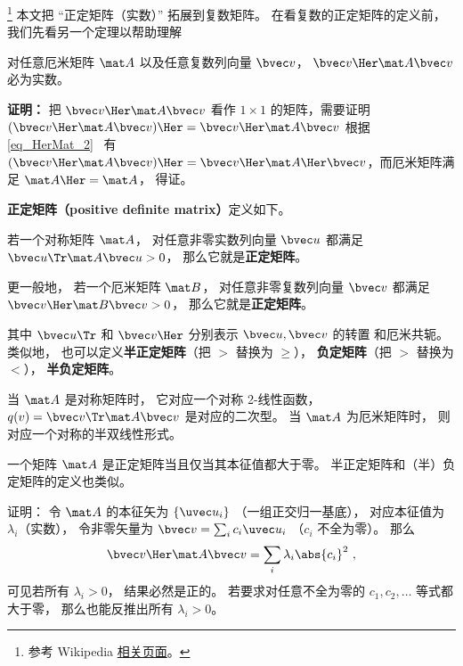 


\footnote{参考 Wikipedia \href{https://en.wikipedia.org/wiki/Definite_matrix}{相关页面}。}
本文把 “正定矩阵（实数）” 拓展到复数矩阵。 在看复数的正定矩阵的定义前，我们先看另一个定理以帮助理解

\begin{theorem}{}
对任意厄米矩阵 $\mat A$ 以及任意复数列向量 $\bvec v$， $\bvec v\Her \mat A \bvec v$ 必为实数。
\end{theorem}
\textbf{证明：} 把 $\bvec v\Her \mat A \bvec v$ 看作 $1\times 1$ 的矩阵，需要证明 $(\bvec v\Her \mat A \bvec v)\Her = \bvec v\Her \mat A \bvec v$ 根据\autoref{eq_HerMat_2}~ 有 $(\bvec v\Her \mat A \bvec v)\Her = \bvec v\Her \mat A\Her \bvec v$，而厄米矩阵满足 $\mat A\Her=\mat A$， 得证。

\textbf{正定矩阵（positive definite matrix）}定义如下。
\begin{definition}{}
若一个对称矩阵 $\mat A$， 对任意非零实数列向量 $\bvec u$ 都满足 $\bvec u\Tr \mat A \bvec u > 0$， 那么它就是\textbf{正定矩阵}。

更一般地， 若一个厄米矩阵 $\mat B$， 对任意非零复数列向量 $\bvec v$ 都满足 $\bvec v\Her \mat B \bvec v > 0$， 那么它就是\textbf{正定矩阵}。
\end{definition}
其中 $\bvec u\Tr$ 和 $\bvec v\Her$ 分别表示 $\bvec u, \bvec v$ 的转置 和厄米共轭。 类似地， 也可以定义\textbf{半正定矩阵}（把 $>$ 替换为 $\geqslant$）， \textbf{负定矩阵}（把 $>$ 替换为 $<$）， \textbf{半负定矩阵}。

当 $\mat A$ 是对称矩阵时， 它对应一个对称 2-线性函数， $q(v) = \bvec v\Tr \mat A \bvec v$ 是对应的二次型。 当 $\mat A$ 为厄米矩阵时， 则对应一个对称的半双线性形式。

\begin{theorem}{}
一个矩阵 $\mat A$ 是正定矩阵当且仅当其本征值都大于零。 半正定矩阵和（半）负定矩阵的定义也类似。
\end{theorem}

证明： 令 $\mat A$ 的本征矢为 $\{\uvec u_i\}$ （一组正交归一基底）， 对应本征值为 $\lambda_i$（实数）， 令非零矢量为 $\bvec v = \sum_i c_i \uvec u_i$ （$c_i$ 不全为零）。 那么
\begin{equation}
\bvec v\Her \mat A \bvec v = \sum_i \lambda_i \abs{c_i}^2~,
\end{equation}
可见若所有 $\lambda_i > 0$， 结果必然是正的。 若要求对任意不全为零的 $c_1,c_2,\dots$ 等式都大于零， 那么也能反推出所有 $\lambda_i > 0$。

